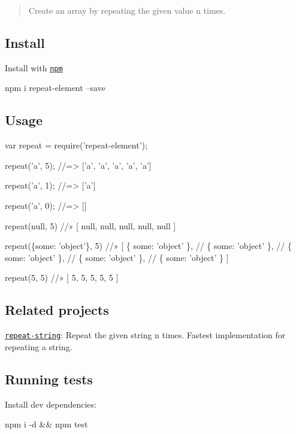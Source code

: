 \begin{quote}
Create an array by repeating the given value n times. \end{quote}


\subsection*{Install}

Install with \href{https://www.npmjs.com/}{\tt npm}


\begin{DoxyCode}
npm i repeat-element --save
\end{DoxyCode}


\subsection*{Usage}


\begin{DoxyCode}
var repeat = require('repeat-element');

repeat('a', 5);
//=> ['a', 'a', 'a', 'a', 'a']

repeat('a', 1);
//=> ['a']

repeat('a', 0);
//=> []

repeat(null, 5)
//» [ null, null, null, null, null ]

repeat(\{some: 'object'\}, 5)
//» [ \{ some: 'object' \},
//    \{ some: 'object' \},
//    \{ some: 'object' \},
//    \{ some: 'object' \},
//    \{ some: 'object' \} ]

repeat(5, 5)
//» [ 5, 5, 5, 5, 5 ]
\end{DoxyCode}


\subsection*{Related projects}

\href{https://github.com/jonschlinkert/repeat-string}{\tt repeat-\/string}\+: Repeat the given string n times. Fastest implementation for repeating a string.

\subsection*{Running tests}

Install dev dependencies\+:


\begin{DoxyCode}
npm i -d && npm test
\end{DoxyCode}


